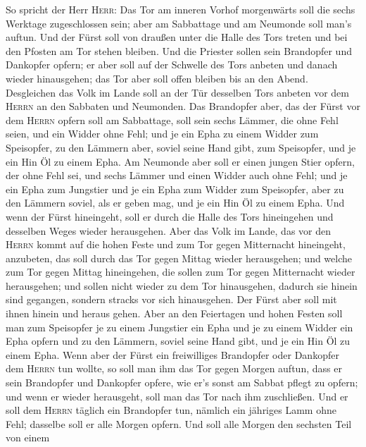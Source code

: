  So spricht der Herr \textsc{Herr}: Das Tor am inneren
Vorhof morgenwärts soll die sechs Werktage zugeschlossen sein; aber am
Sabbattage und am Neumonde soll man's auftun.  Und der
Fürst soll von draußen unter die Halle des Tors treten und bei den
Pfosten am Tor stehen bleiben. Und die Priester sollen sein Brandopfer
und Dankopfer opfern; er aber soll auf der Schwelle des Tors anbeten und
danach wieder hinausgehen; das Tor aber soll offen bleiben bis an den
Abend.  Desgleichen das Volk im Lande soll an der Tür
desselben Tors anbeten vor dem \textsc{Herrn} an den Sabbaten und
Neumonden.  Das Brandopfer aber, das der Fürst vor dem
\textsc{Herrn} opfern soll am Sabbattage, soll sein sechs Lämmer, die
ohne Fehl seien, und ein Widder ohne Fehl;  und je ein
Epha zu einem Widder zum Speisopfer, zu den Lämmern aber, soviel seine
Hand gibt, zum Speisopfer, und je ein Hin Öl zu einem Epha.
 Am Neumonde aber soll er einen jungen Stier opfern, der
ohne Fehl sei, und sechs Lämmer und einen Widder auch ohne Fehl;
 und je ein Epha zum Jungstier und je ein Epha zum Widder
zum Speisopfer, aber zu den Lämmern soviel, als er geben mag, und je ein
Hin Öl zu einem Epha.  Und wenn der Fürst hineingeht, soll
er durch die Halle des Tors hineingehen und desselben Weges wieder
herausgehen.  Aber das Volk im Lande, das vor den
\textsc{Herrn} kommt auf die hohen Feste und zum Tor gegen Mitternacht
hineingeht, anzubeten, das soll durch das Tor gegen Mittag wieder
herausgehen; und welche zum Tor gegen Mittag hineingehen, die sollen zum
Tor gegen Mitternacht wieder herausgehen; und sollen nicht wieder zu dem
Tor hinausgehen, dadurch sie hinein sind gegangen, sondern stracks vor
sich hinausgehen.  Der Fürst aber soll mit ihnen hinein
und heraus gehen.  Aber an den Feiertagen und hohen
Festen soll man zum Speisopfer je zu einem Jungstier ein Epha und je zu
einem Widder ein Epha opfern und zu den Lämmern, soviel seine Hand gibt,
und je ein Hin Öl zu einem Epha.  Wenn aber der Fürst ein
freiwilliges Brandopfer oder Dankopfer dem \textsc{Herrn} tun wollte, so
soll man ihm das Tor gegen Morgen auftun, dass er sein Brandopfer und
Dankopfer opfere, wie er's sonst am Sabbat pflegt zu opfern; und wenn er
wieder herausgeht, soll man das Tor nach ihm zuschließen.
 Und er soll dem \textsc{Herrn} täglich ein Brandopfer
tun, nämlich ein jähriges Lamm ohne Fehl; dasselbe soll er alle Morgen
opfern.  Und soll alle Morgen den sechsten Teil von einem

